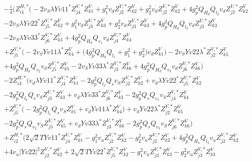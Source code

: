 \begin{align} 
 &-\frac{i}{4} \Big(Z^{H,*}_{i 1} \Big(-2 v_S \lambda Yv11^* Z^{V,*}_{j 4} Z_{{k 1}}^{V} +g_{1}^{2} v_d Z^{V,*}_{j 2} Z_{{k 2}}^{V} +g_{2}^{2} v_d Z^{V,*}_{j 2} Z_{{k 2}}^{V} +4 g_{p}^{2} Q_{H_d} Q_{l_2} v_d Z^{V,*}_{j 2} Z_{{k 2}}^{V} \nonumber \\ 
 &-2 v_S \lambda Yv22^* Z^{V,*}_{j 5} Z_{{k 2}}^{V} +g_{1}^{2} v_d Z^{V,*}_{j 3} Z_{{k 3}}^{V} +g_{2}^{2} v_d Z^{V,*}_{j 3} Z_{{k 3}}^{V} +4 g_{p}^{2} Q_{H_d} Q_{l_3} v_d Z^{V,*}_{j 3} Z_{{k 3}}^{V} \nonumber \\ 
 &-2 v_S \lambda Yv33^* Z^{V,*}_{j 6} Z_{{k 3}}^{V} +4 g_{p}^{2} Q_{H_d} Q_{v_1} v_d Z^{V,*}_{j 4} Z_{{k 4}}^{V} \nonumber \\ 
 &+Z^{V,*}_{j 1} \Big(-2 v_S Yv11 \lambda^* Z_{{k 4}}^{V}  + \Big(4 g_{p}^{2} Q_{H_d} Q_{l_1}  + g_{1}^{2} + g_{2}^{2}\Big)v_d Z_{{k 1}}^{V} \Big)-2 v_S Yv22 \lambda^* Z^{V,*}_{j 2} Z_{{k 5}}^{V} \nonumber \\ 
 &+4 g_{p}^{2} Q_{H_d} Q_{v_2} v_d Z^{V,*}_{j 5} Z_{{k 5}}^{V} -2 v_S Yv33 \lambda^* Z^{V,*}_{j 3} Z_{{k 6}}^{V} +4 g_{p}^{2} Q_{H_d} Q_{v_3} v_d Z^{V,*}_{j 6} Z_{{k 6}}^{V} \Big)\nonumber \\ 
 &-2 Z^{H,*}_{i 3} \Big(v_d \lambda Yv11^* Z^{V,*}_{j 4} Z_{{k 1}}^{V} -2 g_{p}^{2} Q_{l_2} Q_s v_S Z^{V,*}_{j 2} Z_{{k 2}}^{V} +v_d \lambda Yv22^* Z^{V,*}_{j 5} Z_{{k 2}}^{V} \nonumber \\ 
 &-2 g_{p}^{2} Q_{l_3} Q_s v_S Z^{V,*}_{j 3} Z_{{k 3}}^{V} +v_d \lambda Yv33^* Z^{V,*}_{j 6} Z_{{k 3}}^{V} -2 g_{p}^{2} Q_s Q_{v_1} v_S Z^{V,*}_{j 4} Z_{{k 4}}^{V} \nonumber \\ 
 &+Z^{V,*}_{j 1} \Big(-2 g_{p}^{2} Q_{l_1} Q_s v_S Z_{{k 1}}^{V}  + v_d Yv11 \lambda^* Z_{{k 4}}^{V} \Big)+v_d Yv22 \lambda^* Z^{V,*}_{j 2} Z_{{k 5}}^{V} \nonumber \\ 
 &-2 g_{p}^{2} Q_s Q_{v_2} v_S Z^{V,*}_{j 5} Z_{{k 5}}^{V} +v_d Yv33 \lambda^* Z^{V,*}_{j 3} Z_{{k 6}}^{V} -2 g_{p}^{2} Q_s Q_{v_3} v_S Z^{V,*}_{j 6} Z_{{k 6}}^{V} \Big)\nonumber \\ 
 &+Z^{H,*}_{i 2} \Big(2 \sqrt{2} TYv11^* Z^{V,*}_{j 4} Z_{{k 1}}^{V} - g_{1}^{2} v_u Z^{V,*}_{j 2} Z_{{k 2}}^{V} - g_{2}^{2} v_u Z^{V,*}_{j 2} Z_{{k 2}}^{V} +4 g_{p}^{2} Q_{H_u} Q_{l_2} v_u Z^{V,*}_{j 2} Z_{{k 2}}^{V} \nonumber \\ 
 &+4 v_u |Yv22|^2 Z^{V,*}_{j 2} Z_{{k 2}}^{V} +2 \sqrt{2} TYv22^* Z^{V,*}_{j 5} Z_{{k 2}}^{V} - g_{1}^{2} v_u Z^{V,*}_{j 3} Z_{{k 3}}^{V} - g_{2}^{2} v_u Z^{V,*}_{j 3} Z_{{k 3}}^{V} \nonumber \\ 

\end{align}
